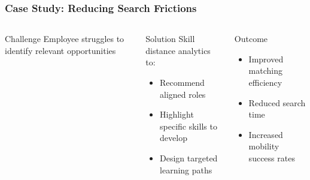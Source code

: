 \documentclass[11pt,xcolor={dvipsnames},hyperref={pdftex,pdfpagemode=UseNone,hidelinks,pdfdisplaydoctitle=true},usepdftitle=false]{beamer}
\begin{document}
\begin{frame}
\frametitle{Case Study: Reducing Search Frictions}
\begin{center}
\end{center}

\begin{columns}
\begin{column}{0.3\textwidth}
\begin{block}{Challenge}
Employee struggles to identify relevant opportunities
\end{block}
\end{column}

\begin{column}{0.3\textwidth}
\begin{block}{Solution}
Skill distance analytics to:
\begin{itemize}
\item Recommend aligned roles
\item Highlight specific skills to develop
\item Design targeted learning paths
\end{itemize}
\end{block}
\end{column}

\begin{column}{0.3\textwidth}
\begin{block}{Outcome}
\begin{itemize}
\item Improved matching efficiency
\item Reduced search time
\item Increased mobility success rates
\end{itemize}
\end{block}
\end{column}
\end{columns}
\end{frame}
\end{document}
